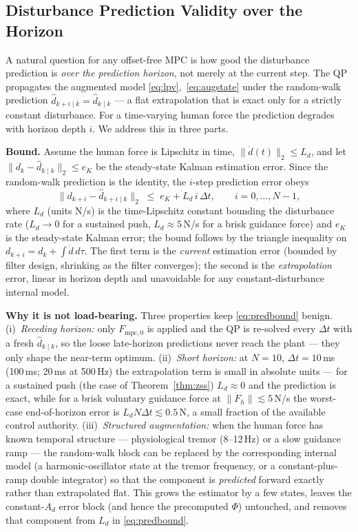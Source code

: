 \documentclass[journal]{IEEEtran}
\newcommand{\Fmpck}[1]{F_{\text{mpc},#1}}
\newcommand{\dhat}{\hat{d}}
\begin{document}
\subsection{Disturbance Prediction Validity over the Horizon}

A natural question for any offset-free MPC is how good the disturbance
prediction is \emph{over the prediction horizon}, not merely at the current
step. The QP propagates the augmented model
\eqref{eq:lpv},~\eqref{eq:augstate} under the random-walk prediction
$\dhat_{k+i\mid k}=\dhat_{k\mid k}$ --- a flat extrapolation that is exact only
for a strictly constant disturbance. For a time-varying human force the
prediction degrades with horizon depth $i$. We address this in three parts.

\textbf{Bound.} Assume the human force is Lipschitz in time,
$\|\dot{d}(t)\|_2\le L_d$, and let $\|d_k-\dhat_{k\mid k}\|_2\le e_K$ be the
steady-state Kalman estimation error. Since the random-walk prediction is the
identity, the $i$-step prediction error obeys
\begin{equation}\label{eq:predbound}
  \|d_{k+i}-\dhat_{k+i\mid k}\|_2 \;\le\; e_K + L_d\,i\,\Delta t,
  \qquad i=0,\dots,N-1,
\end{equation}
where $L_d$ (units N/s) is the time-Lipschitz constant bounding the
disturbance rate ($L_d\to0$ for a sustained push, $L_d\approx5$\,N/s for a
brisk guidance force) and $e_K$ is the steady-state Kalman error; the bound
follows by the triangle inequality on $d_{k+i}=d_k+\int\dot{d}\,d\tau$. The
first term is the \emph{current} estimation error (bounded by filter design,
shrinking as the filter converges); the second is the \emph{extrapolation}
error, linear in horizon depth and unavoidable for any constant-disturbance
internal model.

\textbf{Why it is not load-bearing.} Three properties keep
\eqref{eq:predbound} benign. (i)~\emph{Receding horizon:} only $\Fmpck{0}$ is
applied and the QP is re-solved every $\Delta t$ with a fresh
$\dhat_{k\mid k}$, so the loose late-horizon predictions never reach the plant
--- they only shape the near-term optimum. (ii)~\emph{Short horizon:} at
$N=10$, $\Delta t=10$\,ms (100\,ms; 20\,ms at 500\,Hz) the extrapolation term
is small in absolute units --- for a sustained push (the case of
Theorem~\ref{thm:zss}) $L_d\approx0$ and the prediction is exact, while for a
brisk voluntary guidance force at $\|\dot F_h\|\lesssim5$\,N/s the worst-case
end-of-horizon error is $L_d N\Delta t\lesssim0.5$\,N, a small fraction of the
available control authority. (iii)~\emph{Structured augmentation:} when the
human force has known temporal structure --- physiological tremor
(8--12\,Hz) or a slow guidance ramp --- the random-walk block can be replaced
by the corresponding internal model (a harmonic-oscillator state at the tremor
frequency, or a constant-plus-ramp double integrator) so that the component is
\emph{predicted} forward exactly rather than extrapolated flat. This grows the
estimator by a few states, leaves the constant-$A_d$ error block (and hence
the precomputed $\Phi$) untouched, and removes that component from $L_d$ in
\eqref{eq:predbound}.
\end{document}
